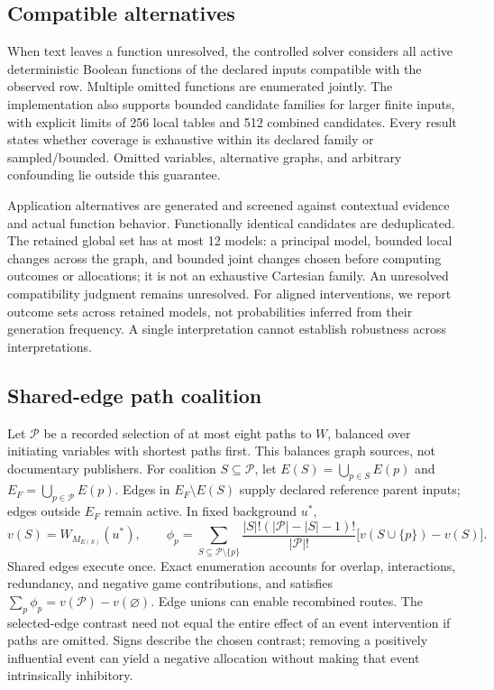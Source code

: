 \documentclass{svproc}
\begin{document}
\subsection{Compatible alternatives}
When text leaves a function unresolved, the controlled solver considers all active deterministic Boolean functions of the declared inputs compatible with the observed row. Multiple omitted functions are enumerated jointly. The implementation also supports bounded candidate families for larger finite inputs, with explicit limits of 256 local tables and 512 combined candidates. Every result states whether coverage is exhaustive within its declared family or sampled/bounded. Omitted variables, alternative graphs, and arbitrary confounding lie outside this guarantee.

Application alternatives are generated and screened against contextual evidence and actual function behavior. Functionally identical candidates are deduplicated. The retained global set has at most 12 models: a principal model, bounded local changes across the graph, and bounded joint changes chosen before computing outcomes or allocations; it is not an exhaustive Cartesian family. An unresolved compatibility judgment remains unresolved. For aligned interventions, we report outcome sets across retained models, not probabilities inferred from their generation frequency. A single interpretation cannot establish robustness across interpretations.

\subsection{Shared-edge path coalition}
Let $\mathcal P$ be a recorded selection of at most eight paths to $W$, balanced over initiating variables with shortest paths first. This balances graph sources, not documentary publishers. For coalition $S\subseteq\mathcal P$, let $E(S)=\bigcup_{p\in S}E(p)$ and $E_F=\bigcup_{p\in\mathcal P}E(p)$. Edges in $E_F\setminus E(S)$ supply declared reference parent inputs; edges outside $E_F$ remain active. In fixed background $u^*$,
\begin{equation}
v(S)=W_{M_{E(S)}}(u^*),\qquad
\phi_p=\sum_{S\subseteq\mathcal P\setminus\{p\}}
\frac{|S|!(|\mathcal P|-|S|-1)!}{|\mathcal P|!}
\bigl[v(S\cup\{p\})-v(S)\bigr].
\end{equation}
Shared edges execute once. Exact enumeration accounts for overlap, interactions, redundancy, and negative game contributions, and satisfies $\sum_p\phi_p=v(\mathcal P)-v(\varnothing)$. Edge unions can enable recombined routes. The selected-edge contrast need not equal the entire effect of an event intervention if paths are omitted. Signs describe the chosen contrast; removing a positively influential event can yield a negative allocation without making that event intrinsically inhibitory.
\end{document}

